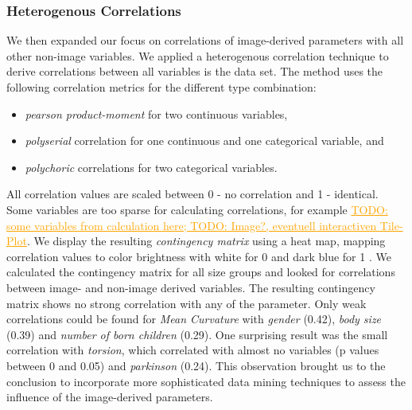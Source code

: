 \documentclass[a4paper,twoside]{style/article}
\newcommand{\com}[1]{\textcolor{orange}{\uline{#1}}}
\begin{document}
\subsubsection{Heterogenous Correlations}
We then expanded our focus on correlations of image-derived parameters with all other non-image variables.
We applied a heterogenous correlation technique to derive correlations between all variables is the data set.
The method uses the following correlation metrics for the different type combination:
\begin{itemize}
\item \emph{pearson product-moment} for two continuous variables, 
\item \emph{polyserial} correlation for one continuous and one categorical variable, and
\item \emph{polychoric} correlations for two categorical variables.
\end{itemize}
All correlation values are scaled between 0 - no correlation and 1 - identical.
Some variables are too sparse for calculating correlations, for example \com{TODO: some variables from calculation here; TODO: Image?, eventuell interactiven Tile-Plot}.
We display the resulting \emph{contingency matrix} using a heat map, mapping correlation values to color brightness with white for 0 and dark blue for 1 \cite{Klemm2014VIS}.
We calculated the contingency matrix for all size groups and looked for correlations between image- and non-image derived variables.
The resulting contingency matrix shows no strong correlation with any of the parameter.
Only weak correlations could be found for \emph{Mean Curvature} with \emph{gender} (0.42), \emph{body size} (0.39) and \emph{number of born children} (0.29).
One surprising result was the small correlation with \emph{torsion}, which correlated with almost no variables (p values between 0 and 0.05) and \emph{parkinson} (0.24).
This observation brought us to the conclusion to incorporate more sophisticated data mining techniques to assess the influence of the image-derived parameters.
\end{document}
